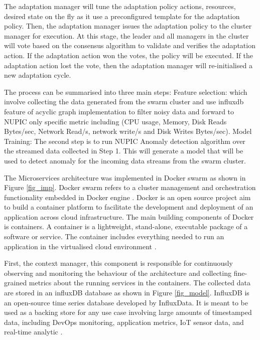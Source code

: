 \documentclass[sigconf]{acmart}
\begin{document}
The adaptation manager will tune the adaptation policy actions, resources, desired state on the fly as it use a preconfigured template for the adaptation policy. Then, the adaptation manager issues the adaptation policy to the cluster manager for execution. At this stage, the   leader and all managers in the cluster will vote based on the consensus algorithm to validate and verifies the adaptation action. If the adaptation action won the votes, the policy will be executed. If the adaptation action lost the vote, then the adaptation manager will re-initialised a new adaptation cycle.  

The process can be summarised into three main steps: 
Feature selection: which involve collecting the data generated from the swarm cluster and use influxdb feature of acyclic graph implementation to filter noisy data and forward to NUPIC only specific metric including (CPU usage, Memory, Disk Reads Bytes/sec, Network Read/s, network write/s and Disk Writes Bytes/sec). 
Model Training: The second step is to run NUPIC Anomaly detection algorithm over the streamed data collected in Step 1. This will generate a model that will be used to detect anomaly for the incoming data streams from the swarm cluster. 


The Microservices architecture was implemented in Docker swarm \cite{docker_2017} as shown in Figure \ref{fig_imp}. Docker swarm refers to a cluster management and orchestration functionality embedded in Docker engine \cite{docker_2017}. Docker is an open source project aim to build a container platform to facilitate the development and deployment of an application across cloud infrastructure. The main building components of Docker is containers. A container is a lightweight, stand-alone, executable package of a software or service. The container includes everything needed to run an application in the virtualised cloud environment \cite{docker_2017}. 


First, the context manager, this component is responsible for continuously observing and monitoring the behaviour of the architecture and collecting fine-grained metrics about the running services in the containers. The collected data are stored in an influxDB database as shown in Figure \ref{fig_model}. InfluxDB is an open-source time series database developed by InfluxData. It is meant to be used as a backing store for any use case involving large amounts of timestamped data, including DevOps monitoring, application metrics, IoT sensor data, and real-time analytic \cite{InfluxDB:uh}.
\end{document}

